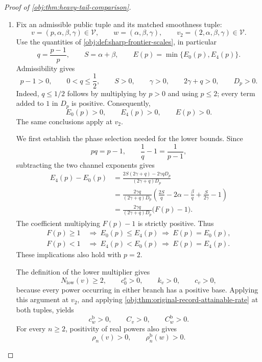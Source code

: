 \documentclass[11pt]{article}
\begin{document}
\begin{proof}[Proof of \cref{obj:thm:heavy-tail-comparison}]
\begin{enumerate}
\item Fix an admissible public tuple and its matched smoothness tuple:
\[
v=(p,\alpha,\beta,\gamma)\in\mathcal V,
\qquad
w=(\alpha,\beta,\gamma),
\qquad
v_2=(2,\alpha,\beta,\gamma)\in\mathcal V.
\]
Use the quantities of \cref{obj:def:sharp-frontier-scales}, in particular
\[
q=\frac{p-1}{p},
\qquad
S=\alpha+\beta,
\qquad
E(p)=\min\{E_0(p),E_4(p)\}.
\]
Admissibility gives
\[
p-1>0,\qquad
0<q\le\frac12,\qquad
S>0,\qquad
\gamma>0,\qquad
2\gamma+q>0,\qquad
D_p>0.
\]
Indeed, \(q\le1/2\) follows by multiplying by \(p>0\) and using \(p\le2\); every term added to \(1\) in \(D_p\) is positive. Consequently,
\[
E_0(p)>0,\qquad E_4(p)>0,\qquad E(p)>0.
\]
The same conclusions apply at \(v_2\).

We first establish the phase selection needed for the lower bounds. Since
\[
pq=p-1,
\qquad
\frac1q-1=\frac1{p-1},
\]
subtracting the two channel exponents gives
\[
\begin{aligned}
E_4(p)-E_0(p)
&=\frac{2S(2\gamma+q)-2\gamma qD_p}
        {(2\gamma+q)D_p}\\
&=\frac{2\gamma q}{(2\gamma+q)D_p}
  \left(
  \frac{2S}{q}-2\alpha-\frac{\beta}{q}
  +\frac{S}{2\gamma}-1
  \right)\\
&=\frac{2\gamma q}{(2\gamma+q)D_p}\bigl(F(p)-1\bigr).
\end{aligned}
\]
The coefficient multiplying \(F(p)-1\) is strictly positive. Thus
\[
\begin{aligned}
F(p)\ge1&\ \Longrightarrow\ E_0(p)\le E_4(p)
                       \ \Longrightarrow\ E(p)=E_0(p),\\
F(p)<1&\ \Longrightarrow\ E_4(p)<E_0(p)
                       \ \Longrightarrow\ E(p)=E_4(p).
\end{aligned}
\]
These implications also hold with \(p=2\).

The definition of the lower multiplier gives
\[
N_{\mathrm{low}}(v)\ge2,
\qquad
c_0^{\mathrm e}>0,
\qquad
k_v>0,
\qquad
c_v>0,
\]
because every power occurring in either branch has a positive base. Applying this argument at \(v_2\), and applying \cref{obj:thm:original-record-attainable-rate} at both tuples, yields
\[
c_w^{\mathrm b}>0,\qquad C_v>0,\qquad C_w^{\mathrm b}>0.
\]
For every \(n\ge2\), positivity of real powers also gives
\[
\rho_n(v)>0,
\qquad
\rho_n^{\mathrm b}(w)>0.
\]


\end{enumerate}
\end{proof}
\end{document}
